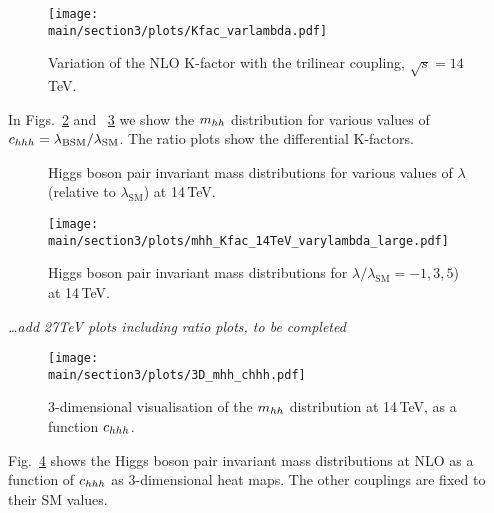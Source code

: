 \begin{figure}[htb]
  \centering
    \texttt{[image: \\main/section3/plots/Kfac\_varlambda.pdf]}
\caption{Variation of the NLO K-factor with the trilinear coupling, $\sqrt{s}=14$\,TeV.}
\label{fig:Kfacvariation}
\end{figure}



In Figs.~\ref{fig:lambda_small} and ~\ref{fig:lambda_large} we show the $m_{hh}$ distribution for various values of $c_{hhh}=\lambda_{\mathrm{BSM}}/\lambda_{\mathrm{SM}}$. 
The ratio plots show the differential K-factors. 

\begin{figure}[htb]
  \centering
 \caption{Higgs boson pair invariant mass distributions for various values of $\lambda$ (relative to $\lambda_{\mathrm{SM}}$)  at 14\,TeV.}
\label{fig:lambda_small}
\end{figure}
%
\begin{figure}[htb]
  \centering
    \texttt{[image: \\main/section3/plots/mhh\_Kfac\_14TeV\_varylambda\_large.pdf]}
\caption{Higgs boson pair invariant mass distributions for $\lambda/\lambda_{\mathrm{SM}}=-1,3,5$)  at 14\,TeV.}
\label{fig:lambda_large}
\end{figure}

{\it \ldots add 27TeV plots including ratio plots, to be completed}

\begin{figure}[ht]
\begin{center}
  \texttt{[image: \\main/section3/plots/3D\_mhh\_chhh.pdf]}    
\end{center}
\caption{3-dimensional visualisation of the $m_{hh}$ distribution at
  14\,TeV, as a function  $c_{hhh}$.}
\label{fig:chhh_3D}
\end{figure}
Fig.~\ref{fig:chhh_3D} shows the Higgs boson pair invariant mass
distributions at NLO as a function of $c_{hhh}$  as 3-dimensional heat maps.
The other couplings are fixed to their SM values.
 
%


